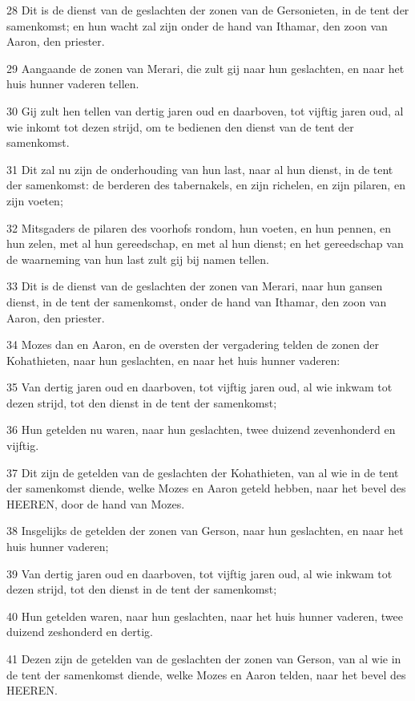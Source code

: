 \par 28 Dit is de dienst van de geslachten der zonen van de Gersonieten, in de tent der samenkomst; en hun wacht zal zijn onder de hand van Ithamar, den zoon van Aaron, den priester.
\par 29 Aangaande de zonen van Merari, die zult gij naar hun geslachten, en naar het huis hunner vaderen tellen.
\par 30 Gij zult hen tellen van dertig jaren oud en daarboven, tot vijftig jaren oud, al wie inkomt tot dezen strijd, om te bedienen den dienst van de tent der samenkomst.
\par 31 Dit zal nu zijn de onderhouding van hun last, naar al hun dienst, in de tent der samenkomst: de berderen des tabernakels, en zijn richelen, en zijn pilaren, en zijn voeten;
\par 32 Mitsgaders de pilaren des voorhofs rondom, hun voeten, en hun pennen, en hun zelen, met al hun gereedschap, en met al hun dienst; en het gereedschap van de waarneming van hun last zult gij bij namen tellen.
\par 33 Dit is de dienst van de geslachten der zonen van Merari, naar hun gansen dienst, in de tent der samenkomst, onder de hand van Ithamar, den zoon van Aaron, den priester.
\par 34 Mozes dan en Aaron, en de oversten der vergadering telden de zonen der Kohathieten, naar hun geslachten, en naar het huis hunner vaderen:
\par 35 Van dertig jaren oud en daarboven, tot vijftig jaren oud, al wie inkwam tot dezen strijd, tot den dienst in de tent der samenkomst;
\par 36 Hun getelden nu waren, naar hun geslachten, twee duizend zevenhonderd en vijftig.
\par 37 Dit zijn de getelden van de geslachten der Kohathieten, van al wie in de tent der samenkomst diende, welke Mozes en Aaron geteld hebben, naar het bevel des HEEREN, door de hand van Mozes.
\par 38 Insgelijks de getelden der zonen van Gerson, naar hun geslachten, en naar het huis hunner vaderen;
\par 39 Van dertig jaren oud en daarboven, tot vijftig jaren oud, al wie inkwam tot dezen strijd, tot den dienst in de tent der samenkomst;
\par 40 Hun getelden waren, naar hun geslachten, naar het huis hunner vaderen, twee duizend zeshonderd en dertig.
\par 41 Dezen zijn de getelden van de geslachten der zonen van Gerson, van al wie in de tent der samenkomst diende, welke Mozes en Aaron telden, naar het bevel des HEEREN.
